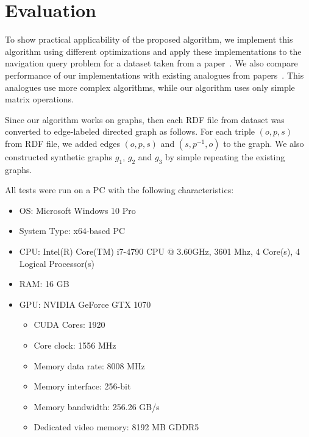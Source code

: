 \section{Evaluation}
To show practical applicability of the proposed algorithm, we implement this algorithm using different optimizations and apply these implementations to the navigation query problem for a dataset taken from a paper~\cite{RDF}. We also compare performance of our implementations with existing analogues from papers~\cite{GLL,RDF}. This analogues use more complex algorithms, while our algorithm uses only simple matrix operations.

Since our algorithm works on graphs, then each RDF file from dataset was converted to edge-labeled directed graph as follows. For each triple $(o,p,s)$ from RDF file, we added edges $(o,p,s)$ and $(s,p^{-1},o)$ to the graph. We also constructed synthetic graphs $g_1$, $g_2$ and $g_3$ by simple repeating the existing graphs.

All tests were run on a PC with the following characteristics:
\begin{itemize}
    \item OS: Microsoft Windows 10 Pro
    \item System Type: x64-based PC
    \item CPU: Intel(R) Core(TM) i7-4790 CPU @ 3.60GHz, 3601 Mhz, 4 Core(s), 4 Logical Processor(s)
    \item RAM: 16 GB
    \item GPU: NVIDIA GeForce GTX 1070
    \begin{itemize}
        \item CUDA Cores:       1920 
        \item Core clock:       1556 MHz 
        \item Memory data rate: 8008 MHz
        \item Memory interface: 256-bit 
        \item Memory bandwidth: 256.26 GB/s
        \item Dedicated video memory:   8192 MB GDDR5
    \end{itemize}
\end{itemize}

